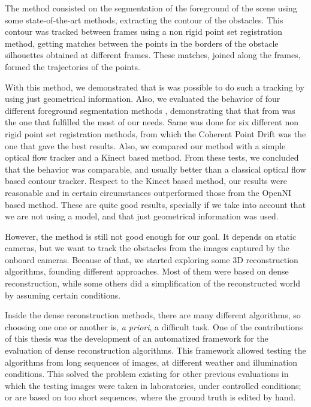 The method consisted on the segmentation of the foreground of the scene using some state-of-the-art methods, extracting the contour of the obstacles. This contour was tracked between frames using a non rigid point set registration method, getting matches between the points in the borders of the obstacle silhouettes obtained at different frames. These matches, joined along the frames, formed the trajectories of the points.

With this method, we demonstrated that is was possible to do such a tracking by using just geometrical information. Also, we evaluated the behavior of four different foreground segmentation methods \citep{lopez2011stochastic, lopez2011foreground, guo2011hierarchical, reddy2012improved}, demonstrating that that from \cite{reddy2012improved} was the one that fulfilled the most of our needs. Same was done for six different non rigid point set registration methods, from which the Coherent Point Drift was the one that gave the best results. Also, we compared our method with a simple optical flow tracker and a Kinect based method. From these tests, we concluded that the behavior was comparable, and usually better than a classical optical flow based contour tracker. Respect to the Kinect based method, our results were reasonable and in certain circumstances outperformed those from the OpenNI based method. These are quite good results, specially if we take into account that we are not using a model, and that just geometrical information was used.

However, the method is still not good enough for our goal. It depends on static cameras, but we want to track the obstacles from the images captured by the onboard cameras. Because of that, we started exploring some 3D reconstruction algorithms, founding different approaches. Most of them were based on dense reconstruction, while some others did a simplification of the reconstructed world by assuming certain conditions.

Inside the dense reconstruction methods, there are many different algorithms, so choosing one one or another is, \emph{a priori}, a difficult task. One of the contributions of this thesis was the development of an automatized framework for the evaluation of dense reconstruction algorithms. This framework allowed testing the algorithms from long sequences of images, at different weather and illumination conditions. This solved the problem existing for other previous evaluations in which the testing images were taken in laboratories, under controlled conditions; or are based on too short sequences, where the ground truth is edited by hand.

